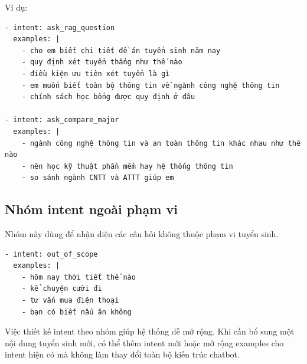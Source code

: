 Ví dụ:

\begin{verbatim}
- intent: ask_rag_question
  examples: |
    - cho em biết chi tiết đề án tuyển sinh năm nay
    - quy định xét tuyển thẳng như thế nào
    - điều kiện ưu tiên xét tuyển là gì
    - em muốn biết toàn bộ thông tin về ngành công nghệ thông tin
    - chính sách học bổng được quy định ở đâu

- intent: ask_compare_major
  examples: |
    - ngành công nghệ thông tin và an toàn thông tin khác nhau như thế nào
    - nên học kỹ thuật phần mềm hay hệ thống thông tin
    - so sánh ngành CNTT và ATTT giúp em
\end{verbatim}

\subsection*{Nhóm intent ngoài phạm vi}

Nhóm này dùng để nhận diện các câu hỏi không thuộc phạm vi tuyển sinh.

\begin{verbatim}
- intent: out_of_scope
  examples: |
    - hôm nay thời tiết thế nào
    - kể chuyện cười đi
    - tư vấn mua điện thoại
    - bạn có biết nấu ăn không
\end{verbatim}

Việc thiết kế intent theo nhóm giúp hệ thống dễ mở rộng. Khi cần bổ sung một nội dung tuyển sinh mới, có thể thêm intent mới hoặc mở rộng examples cho intent hiện có mà không làm thay đổi toàn bộ kiến trúc chatbot.

